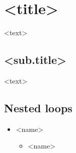 \documentclass[12pt]{article}
\begin{document}
\section{<title>}

<text>

\subsection{<sub.title>}
<text>


\subsection{Nested loops}

\begin{itemize}
	\item <name>
	      \begin{itemize}
		      \item <name>
	      \end{itemize}
\end{itemize}
\end{document}
